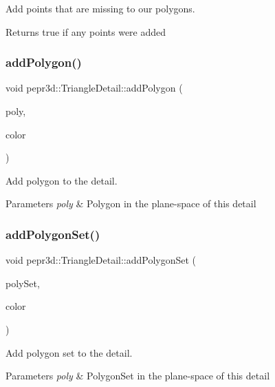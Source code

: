 Add points that are missing to our polygons. 

\begin{DoxyReturn}{Returns}
true if any points were added 
\end{DoxyReturn}
\mbox{\label{classpepr3d_1_1_triangle_detail_a5a7bf09704143a299bb2d6261d540729}} 
\subsubsection{\texorpdfstring{addPolygon()}{addPolygon()}}
{\footnotesize\ttfamily void pepr3d\+::\+Triangle\+Detail\+::add\+Polygon (\begin{DoxyParamCaption}\item[{const Polygon \&}]{poly,  }\item[{size\+\_\+t}]{color }\end{DoxyParamCaption})}



Add polygon to the detail. 


\begin{DoxyParams}{Parameters}
{\em poly} & Polygon in the plane-\/space of this detail \\
\hline
\end{DoxyParams}
\mbox{\label{classpepr3d_1_1_triangle_detail_af1656510445bacca593a631571f83c7f}} 
\subsubsection{\texorpdfstring{addPolygonSet()}{addPolygonSet()}}
{\footnotesize\ttfamily void pepr3d\+::\+Triangle\+Detail\+::add\+Polygon\+Set (\begin{DoxyParamCaption}\item[{Polygon\+Set \&}]{poly\+Set,  }\item[{size\+\_\+t}]{color }\end{DoxyParamCaption})}



Add polygon set to the detail. 


\begin{DoxyParams}{Parameters}
{\em poly} & Polygon\+Set in the plane-\/space of this detail \\
\hline
\end{DoxyParams}
\mbox{\label{classpepr3d_1_1_triangle_detail_a9bce9da8bea065df486537a2933f635c}} 
